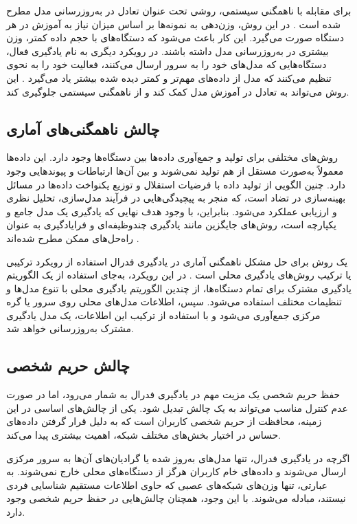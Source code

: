 برای مقابله با ناهمگنی سیستمی، روشی تحت عنوان تعادل در به‌روزرسانی مدل مطرح شده است
\cite{konevcny2015federated}.
در این روش، وزن‌دهی به نمونه‌ها بر اساس میزان نیاز به آموزش در هر دستگاه صورت می‌گیرد. این کار باعث می‌شود که دستگاه‌های با حجم داده کمتر، وزن بیشتری در به‌روزرسانی مدل داشته باشند.
در رویکرد دیگری به نام یادگیری فعال، دستگاه‌هایی که مدل‌های خود را به سرور ارسال می‌کنند، فعالیت خود را به نحوی تنظیم می‌کنند که مدل از داده‌های مهم‌تر و کمتر دیده شده بیشتر یاد می‌گیرد
\cite{konevcny2016federated}.
این روش می‌تواند به تعادل در آموزش مدل کمک کند و از ناهمگنی سیستمی جلوگیری کند.


\subsection{
	چالش ناهمگنی‌های آماری%
}
روش‌های مختلفی برای تولید و جمع‌آوری داده‌ها بین دستگاه‌ها وجود دارد. این داده‌ها معمولاً به‌صورت مستقل از هم تولید نمی‌شوند و بین آن‌ها ارتباطات و پیوندهایی وجود دارد. چنین الگویی از تولید داده با فرضیات استقلال و توزیع یکنواخت داده‌ها
در مسائل بهینه‌سازی در تضاد است، که منجر به پیچیدگی‌هایی در فرآیند مدل‌سازی، تحلیل نظری و ارزیابی عملکرد می‌شود. بنابراین، با وجود هدف نهایی که یادگیری یک مدل جامع و یکپارچه است، روش‌های جایگزین مانند یادگیری چندوظیفه‌ای%
و فرایادگیری%
به عنوان راه‌حل‌های ممکن مطرح شده‌اند
\cite{li2020federated}.


یک روش برای حل مشکل ناهمگنی آماری در یادگیری فدرال استفاده از رویکرد ترکیبی یا ترکیب روش‌های یادگیری محلی است
\cite{konevcny2015federated}.
در این رویکرد، به‌جای استفاده از یک الگوریتم یادگیری مشترک برای تمام دستگاه‌ها، از چندین الگوریتم یادگیری محلی با تنوع مدل‌ها و تنظیمات مختلف استفاده می‌شود. سپس، اطلاعات مدل‌های محلی روی سرور یا گره مرکزی جمع‌آوری می‌شود و با استفاده از ترکیب این اطلاعات، یک مدل یادگیری مشترک به‌روزرسانی خواهد شد.



\subsection{چالش حریم شخصی}\label{privacy_challenge}
حفظ حریم شخصی یک مزیت مهم در یادگیری فدرال به شمار می‌رود، اما در صورت عدم کنترل مناسب می‌تواند به یک چالش تبدیل شود. یکی از چالش‌های اساسی در این زمینه، محافظت از حریم شخصی کاربران است که به دلیل قرار گرفتن داده‌های حساس در اختیار بخش‌های مختلف شبکه، اهمیت بیشتری پیدا می‌کند.

اگرچه در یادگیری فدرال، تنها مدل‌های به‌روز شده یا گرادیان‌های آن‌ها به سرور مرکزی ارسال می‌شوند و داده‌های خام کاربران هرگز از دستگاه‌های محلی خارج نمی‌شوند. به عبارتی، تنها وزن‌های شبکه‌های عصبی که حاوی اطلاعات مستقیم شناسایی فردی نیستند، مبادله می‌شوند. با این وجود، همچنان چالش‌هایی در حفظ حریم شخصی وجود دارد. 

